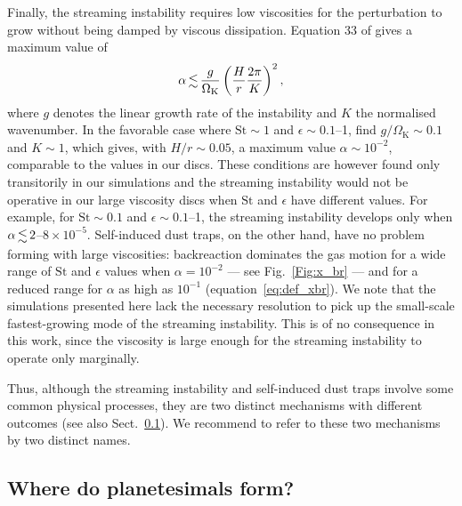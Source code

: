 \documentclass[a4paper,fleqn,usenatbib]{mnras}
\newcommand{\St}{\mathrm{St}}         %
\begin{document}
Finally, the streaming instability requires low viscosities for the perturbation to grow without being damped by viscous dissipation. Equation 33 of \citet{Youdin2005} gives a maximum value of
\begin{equation}
\alpha \la \frac{g}{\Omega_\mathrm{K}} \left(\frac{H}{r} \frac{2\pi}{K}\right)^2,
\end{equation}
where $g$ denotes the linear growth rate of the instability and $K$ the normalised wavenumber. In the favorable case where $\St\sim1$ and $\epsilon\sim0.1$--1, \citet{Youdin2007} find $g/\Omega_\mathrm{K}\sim0.1$ and $K\sim1$, which gives, with $H/r\sim0.05$, a maximum value $\alpha \sim10^{-2}$, comparable to the values in our discs. These conditions are however found only transitorily in our simulations and the streaming instability would not be operative in our large viscosity discs when $\St$ and $\epsilon$ have different values. For example, for $\St\sim0.1$ and $\epsilon\sim0.1$--1, the streaming instability develops only when $\alpha\la2$--$8\times10^{-5}$. Self-induced dust traps, on the other hand, have no problem forming with large viscosities: backreaction dominates the gas motion for a wide range of $\St$ and $\epsilon$ values when $\alpha=10^{-2}$ --- see Fig.~\ref{Fig:x_br} --- and for a reduced range for $\alpha$ as high as $10^{-1}$ (equation~\ref{eq:def_xbr}). We note that the simulations presented here lack the necessary resolution to pick up the small-scale fastest-growing mode of the streaming instability. This is of no consequence in this work, since the viscosity is large enough for the streaming instability to operate only marginally.

Thus, although the streaming instability and self-induced dust traps involve some common physical processes, they are two distinct mechanisms with different outcomes (see also Sect.~\ref{sec:pred}). We recommend to refer to these two mechanisms by two distinct names.
 
 
\subsection{Where do planetesimals form?}
 \label{sec:pred}
 
\end{document}

